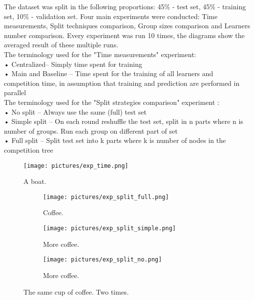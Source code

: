 \documentclass{scrartcl}
\begin{document}
The dataset was split in the following proportions: 45\% - test set, 45\% - training set, 10\% - validation set. Four main experiments were conducted: Time measurements, Split techniques comparison, Group sizes comparison and Learners number comparison. Every experiment was run 10 times, the diagrams show the averaged result of these multiple runs. \\
The terminology used for the "Time measurements" experiment: \\
•	Centralized– Simply time spent for training \\
•	Main and Baseline – Time spent for the training of all learners and competition time, in assumption that training and prediction are performed in parallel \\
The terminology used for the "Split strategies comparison" experiment : \\
•	No split – Always use the same (full) test set \\
•	Simple split – On each round reshuffle the test set, split in n parts where n is number of groups. Run each group on different part of set\\
•	Full split – Split test set into k parts where k is number of nodes in the competition tree\\

\begin{figure}[h!]
  \begin{center}
  \texttt{[image: pictures/exp\_time.png]}
    \end{center}
  \caption{A boat.}
  \label{fig:boat2}
\end{figure}

\begin{figure}[h!]
  \centering
  \begin{subfigure}[b]{0.45\linewidth}
    \texttt{[image: pictures/exp\_split\_full.png]}
    \caption{Coffee.}
  \end{subfigure}\hfill%
  \begin{subfigure}[b]{0.45\linewidth}
    \texttt{[image: pictures/exp\_split\_simple.png]}
    \caption{More coffee.}
  \end{subfigure}
    \begin{subfigure}[b]{0.45\linewidth}
    \texttt{[image: pictures/exp\_split\_no.png]}
    \caption{More coffee.}
  \end{subfigure}
  \caption{The same cup of coffee. Two times.}
  \label{fig:approach}
\end{figure}
\end{document}
